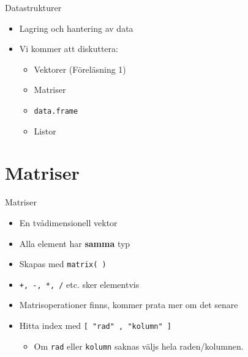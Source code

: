 \documentclass[
  11pt,
  ignorenonframetext,
]{beamer}
\providecommand{\tightlist}{%
  \setlength{\itemsep}{0pt}\setlength{\parskip}{0pt}}
\newcommand\imp[1]{\alert{\textbf{#1}}}
\begin{document}
\begin{frame}{Datastrukturer}
\label{datastrukturer-1}
\begin{itemize}
\tightlist
\item
  Lagring och hantering av data
\item
  Vi kommer att diskuttera:

  \begin{itemize}
  \tightlist
  \item
    Vektorer (Föreläsning 1)
  \item
    Matriser
  \item
    \texttt{data.frame}
  \item
    Listor
  \end{itemize}
\end{itemize}
\end{frame}

\section{Matriser}\label{matriser}

\begin{frame}{Matriser}
\label{matriser-1}
\begin{itemize}
\tightlist
\item
  En tvådimensionell vektor
\item
  Alla element har \imp{samma} typ
\item
  Skapas med \texttt{matrix( )}
\item
  \texttt{+, -, *, /} etc. sker elementvis
\item
  Matrisoperationer finns, kommer prata mer om det senare
\item
  Hitta index med \texttt{[ "rad" , "kolumn" ]}

  \begin{itemize}
  \tightlist
  \item
    Om \texttt{rad} eller \texttt{kolumn} saknas väljs hela
    raden/kolumnen.
  \end{itemize}
\end{itemize}
\end{frame}
\end{document}
